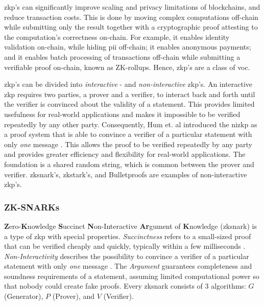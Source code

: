 \acrshort{zkp}'s can significantly improve scaling and privacy limitations of blockchains, and reduce transaction costs. This is done by moving complex computations off-chain while submitting only the result together with a cryptographic proof attesting to the computation's correctness on-chain. For example, it enables identity validation on-chain, while hiding \acrshort{pii} off-chain; it enables anonymous payments; and it enables batch processing of transactions off-chain while submitting a verifiable proof on-chain, known as ZK-rollups. Hence, \acrshort{zkp}'s are a class of \acrfull{voc}.

\acrlong{zkp}'s can be divided into \emph{interactive} - and \emph{non-interactive} \acrshort{zkp}'s. An interactive \acrshort{zkp} requires two parties, a prover and a verifier, to interact back and forth until the verifier is convinced about the validity of a statement. This provides limited usefulness for real-world applications and makes it impossible to be verified repeatedly by any other party. Consequently, Hum et. al \cite{humZeroKnowledgeItsApplications} introduced the \acrfull{nizkp} as a proof system that is able to convince a verifier of a particular statement with only \emph{one} message \cite{eberhardtOffchainingModelsApproaches2018,eberhardtZoKratesScalablePrivacyPreserving2018a,simunicVerifiableComputingApplications2021}. This allows the proof to be verified repeatedly by any party and provides greater efficiency and flexibility for real-world applications. The foundation is a shared random string, which is common between the prover and verifier. \acrshort{zksnark}'s, \acrshort{zkstark}'s, and Bulletproofs are examples of non-interactive \acrshort{zkp}'s.

\subsubsection{ZK-SNARKs}
\label{subsubsec:zksnarks}

\textbf{Z}ero-\textbf{K}nowledge \textbf{S}uccinct \textbf{N}on-Interactive \textbf{Ar}gument of \textbf{K}nowledge (\acrshort{zksnark}) is a type of \acrshort{zkp} with special properties. \emph{Succinctness} refers to a small-sized proof that can be verified cheaply and quickly, typically within a few milliseconds \cite{simunicVerifiableComputingApplications2021}. \emph{Non-Interactivity} describes the possibility to convince a verifier of a particular statement with only \emph{one} message \cite{eberhardtOffchainingModelsApproaches2018,eberhardtZoKratesScalablePrivacyPreserving2018a,simunicVerifiableComputingApplications2021}. The \emph{Argument} guarantees completeness and soundness requirements of a statement, assuming limited computational power so that nobody could create fake proofs. Every \acrshort{zksnark} consists of 3 algorithms: $G$ (Generator), $P$ (Prover), and $V$ (Verifier).

